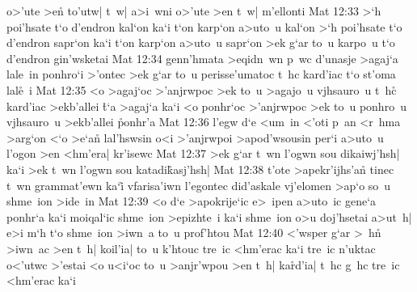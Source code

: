 o>'ute
>en\r{}
to'utw|
t~w|
a>i~wni
o>'ute
>en
t~w|
m'ellonti\bibvsend
\vs Mat 12:33
>`h
poi'hsate
t`o
d'endron
kal`on
ka`i
t`on
karp`on
a>uto~u
kal`on
>`h
poi'hsate
t`o
d'endron
sapr`on
ka`i
t`on
karp`on
a>uto~u
sapr`on
>ek
g`ar
to~u
karpo~u
t`o
d'endron
gin'wsketai\bibvsend
\vs Mat 12:34
genn'hmata
>eqidn~wn
p~wc
d'unasje
>agaj`a
lale~in
ponhro`i
>'ontec
>ek
g`ar
to~u
perisse'umatoc
t~hc
kard'iac
t`o
st'oma
lal\r{e}~i\bibvsend
{}
\vs Mat 12:35
<o
>agaj`oc
>'anjrwpoc
>ek
to~u
>agajo~u
vjhsauro~u
t~hc\r{}
kard'iac
>ekb'allei
\r{t}`a
>agaj`a
ka`i
<o
ponhr`oc
>'anjrwpoc
>ek
to~u
ponhro~u
vjhsauro~u
>ekb'allei
\r{p}onhr'a\bibvsend
{}
\vs Mat 12:36
l'egw
d`e
<um~in
<'oti
p~an
<r~hma
>arg`on
<`o
>e`an\r{}
lal'hswsin
o<i
>'anjrwpoi
>apod'wsousin
per`i
a>uto~u
l'ogon
>en
<hm'era|
kr'isewc\bibvsend
\vs Mat 12:37
>ek
g`ar
t~wn
l'ogwn
sou
dikaiwj'hsh|
ka`i
>ek
t~wn
l'ogwn
sou
katadi\r{k}asj'hsh|\bibvsend
{}
\vs Mat 12:38
t'ote
>apekr'ijhs'a\r{n}
tinec
t~wn
grammat'ewn
ka`i\r{}
vfarisa'iwn
l'egontec
did'askale
vj'elomen
>ap`o
so~u
shme~ion
>ide~in\bibvsend
\vs Mat 12:39
<o
d`e
>apokrije`ic
e>~ipen
a>uto~ic
gene`a
ponhr`a
ka`i
moiqal`ic
shme~ion
>epizhte~i
ka`i
shme~ion
o>u
doj'hsetai
a>ut~h|
e>i
m`h
t`o
shme~ion
>iwn~a
to~u
prof'htou\bibvsend
\vs Mat 12:40
<'wsper
g`ar
>~h\r{n}
>iwn~ac
>en
t~h|
koil'ia|
to~u
k'htouc
tre~ic
<hm'erac
ka`i
tre~ic
n'uktac
o<'utwc
>'estai
<o
u<i`oc
to~u
>anjr'wpou
>en
t~h|
ka\r{r}d'ia|
t~hc
g~hc
tre~ic
<hm'erac
ka`i
